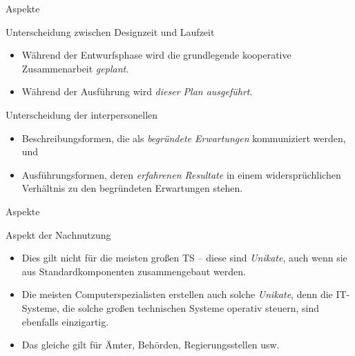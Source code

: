 \documentclass{beamer}
\begin{document}
\begin{frame}{Aspekte}
  \begin{block}{Unterscheidung zwischen Designzeit und Laufzeit}
    \begin{itemize}
    \item Während der Entwurfsphase wird die grundlegende kooperative
      Zusammenarbeit \emph{geplant}.
    \item Während der Ausführung wird \emph{dieser Plan ausgeführt}.
    \end{itemize}
  \end{block}
  \begin{block}{Unterscheidung der interpersonellen} 
    \begin{itemize}
    \item Beschreibungsformen, die als \emph{begründete Erwartungen}
      kommuniziert werden, und
    \item Ausführungsformen, deren \emph{erfahrenen Resultate} in einem
      widersprüchlichen Verhältnis zu den begründeten Erwartungen stehen.
    \end{itemize}
  \end{block}
\end{frame}
\begin{frame}{Aspekte}
  \begin{block}{Aspekt der Nachnutzung}
    \begin{itemize}
    \item Dies gilt nicht für die meisten großen TS -- diese sind
      \emph{Unikate}, auch wenn sie aus Standardkomponenten zusammengebaut
      werden.
    \item Die meisten Computerspezialisten erstellen auch solche
      \emph{Unikate}, denn die IT-Systeme, die solche großen technischen
      Systeme operativ steuern, sind ebenfalls einzigartig.
    \item Das gleiche gilt für Ämter, Behörden, Regierungsstellen usw.
    \end{itemize}
  \end{block}
\end{frame}
\end{document}
